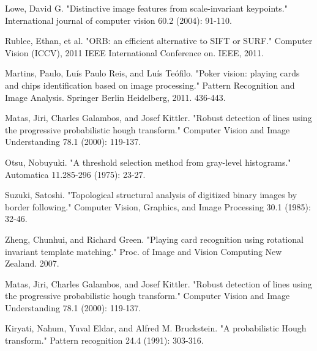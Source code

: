 \documentclass[journal,twoside]{IEEEtran}
\begin{document}
\begin{thebibliography}{9}

Lowe, David G. "Distinctive image features from scale-invariant keypoints." International journal of computer vision 60.2 (2004): 91-110.

Rublee, Ethan, et al. "ORB: an efficient alternative to SIFT or SURF." Computer Vision (ICCV), 2011 IEEE International Conference on. IEEE, 2011.

Martins, Paulo, Luís Paulo Reis, and Luís Teófilo. "Poker vision: playing cards and chips identification based on image processing." Pattern Recognition and Image Analysis. Springer Berlin Heidelberg, 2011. 436-443.

Matas, Jiri, Charles Galambos, and Josef Kittler. "Robust detection of lines using the progressive probabilistic hough transform." Computer Vision and Image Understanding 78.1 (2000): 119-137.

Otsu, Nobuyuki. "A threshold selection method from gray-level histograms." Automatica 11.285-296 (1975): 23-27.

Suzuki, Satoshi. "Topological structural analysis of digitized binary images by border following." Computer Vision, Graphics, and Image Processing 30.1 (1985): 32-46.

Zheng, Chunhui, and Richard Green. "Playing card recognition using rotational invariant template matching." Proc. of Image and Vision Computing New Zealand. 2007.

Matas, Jiri, Charles Galambos, and Josef Kittler. "Robust detection of lines using the progressive probabilistic hough transform." Computer Vision and Image Understanding 78.1 (2000): 119-137.

Kiryati, Nahum, Yuval Eldar, and Alfred M. Bruckstein. "A probabilistic Hough transform." Pattern recognition 24.4 (1991): 303-316.



\end{thebibliography}
\end{document}
